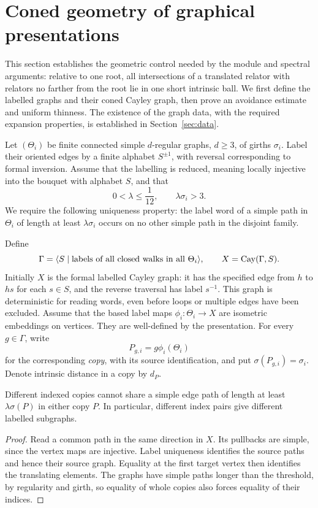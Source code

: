 \section{Coned geometry of graphical presentations}\label{sec:geometry}

This section establishes the geometric control needed by the module and
spectral arguments: relative to one root, all intersections of a translated
relator with relators no farther from the root lie in one short intrinsic
ball. We first define the labelled graphs and their coned Cayley graph,
then prove an avoidance estimate and uniform thinness. The existence of
the graph data, with the required expansion properties, is established in
Section~\ref{sec:data}.

Let \((\Theta_i)\) be finite connected simple \(d\)-regular graphs,
\(d\ge3\), of girths \(\sigma_i\). Label their oriented edges by a finite
alphabet \(S^{\pm1}\), with reversal corresponding to formal inversion.
Assume that the labelling is reduced, meaning locally injective into the
bouquet with alphabet \(S\), and that
\begin{equation}\label{eq:geometric-parameters}
0<\lambda\le\frac1{12},\qquad \lambda\sigma_i>3.
\end{equation}
We require the following uniqueness property: the label word of a simple
path in \(\Theta_i\) of length at least \(\lambda\sigma_i\) occurs on no
other simple path in the disjoint family.

Define
\[
\Gamma=\langle S\mid\text{labels of all closed walks in all }\Theta_i\rangle,
\qquad X=\operatorname{Cay}(\Gamma,S).
\]
Initially \(X\) is the formal labelled Cayley graph: it has the specified
edge from \(h\) to \(hs\) for each \(s\in S\), and the reverse traversal
has label \(s^{-1}\). This graph is deterministic for reading words, even
before loops or multiple edges have been excluded. Assume that the based
label maps \(\phi_i:\Theta_i\to X\) are isometric embeddings on vertices.
They are well-defined by the presentation. For every \(g\in\Gamma\), write
\[
P_{g,i}=g\phi_i(\Theta_i)
\]
for the corresponding \emph{copy}, with its source identification, and put
\(\sigma(P_{g,i})=\sigma_i\). Denote intrinsic distance in a copy by
\(d_P\).

\begin{lemma}\label{lem:distinct-copies}
Different indexed copies cannot share a simple edge path of length at
least \(\lambda\sigma(P)\) in either copy \(P\). In particular, different
index pairs give different labelled subgraphs.
\end{lemma}
\begin{proof}
Read a common path in the same direction in \(X\). Its pullbacks are
simple, since the vertex maps are injective. Label uniqueness identifies
the source paths and hence their source graph. Equality at the first
target vertex then identifies the translating elements. The graphs have
simple paths longer than the threshold, by regularity and girth, so
equality of whole copies also forces equality of their indices.
\end{proof}

